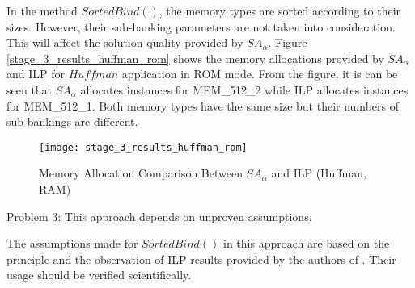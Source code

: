 		In the method $SortedBind()$, the memory types are sorted according to their sizes.
		However, their sub-banking parameters are not taken into consideration. This will affect
		the solution quality provided by $SA_{\alpha}$. Figure \ref{stage_3_results_huffman_rom}
		shows the memory allocations provided by $SA_{\alpha}$ and ILP for $Huffman$
		application in ROM mode. From the figure, it is can be seen that $SA_{\alpha}$ allocates
		instances for MEM\_512\_2 while ILP allocates instances for MEM\_512\_1.
		Both memory types have the same size but their numbers of sub-bankings are different.
		\begin{figure}[htb]
			\begin{center}
				\texttt{[image: stage\_3\_results\_huffman\_rom]}
				\caption{Memory Allocation Comparison Between $SA_{\alpha}$ and ILP (Huffman, RAM)}
				\label{fig:stage_3_results_huffman_rom}
			\end{center}
		\end{figure}		
		
		Problem 3: This approach depends on unproven assumptions.
		
		The assumptions made for $SortedBind()$ in this approach are based on the principle and
		the observation of ILP results provided by the authors of \cite{Strobel2016}.
		Their usage should be verified scientifically.